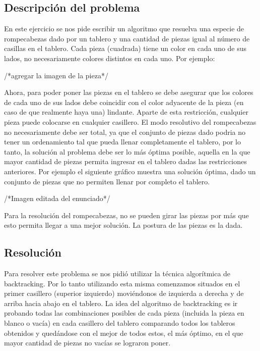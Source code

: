 \subsection{Descripci\'on del problema}

En este ejercicio se nos pide escribir un algoritmo que resuelva una especie de rompecabezas dado por un tablero y una cantidad de piezas igual al n\'umero de casillas en el tablero.
Cada pieza (cuadrada) tiene un color en cada uno de sus lados, no necesariamente colores distintos en cada uno. Por ejemplo: 

/*agregar la imagen de la pieza*/

Ahora, para poder poner las piezas en el tablero se debe asegurar que los colores de cada uno de sus lados debe coincidir con el color adyacente de la pieza (en caso de que realmente haya una) lindante. Aparte de esta restricci\'on, cualquier pieza puede colocarse en cualquier casillero.
El modo resolutivo del rompecabezas no necesariamente debe ser total, ya que el conjunto de piezas dado podria no tener un ordenamiento tal que pueda llenar completamente el tablero, por lo tanto, la soluci\'on al problema debe ser lo m\'as \'optima posible, aquella en la que mayor cantidad de piezas permita ingresar en el tablero dadas las restricciones anteriores.
Por ejemplo el siguiente gr\'afico muestra una soluci\'on \'optima, dado un conjunto de piezas que no permiten llenar por completo el tablero.

/*Imagen editada del enunciado*/

Para la resoluci\'on del rompecabezas, no se pueden girar las piezas por más que esto permita llegar a una mejor soluci\'on. La postura de las piezas es la dada.

\subsection{Resoluci\'on}

Para resolver este problema se nos pidi\'o utilizar la t\'ecnica algor\'itmica de backtracking. Por lo tanto utilizando esta misma comenzamos situados en el primer casillero (superior izquierdo) movi\'endonos de izquierda a derecha y de arriba hacia abajo en el tablero. La idea del algoritmo de backtracking es ir probando todas las combinaciones posibles de cada pieza (incluida la pieza en blanco o vac\'ia) en cada casillero del tablero comparando todos los tableros obtenidos y qued\'andose con el mejor de todos estos, el m\'as \'optimo, en el que mayor cantidad de piezas no vac\'ias se lograron poner.

